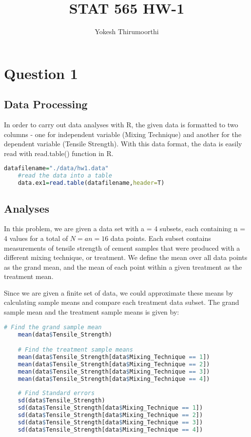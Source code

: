 \documentclass[11pt]{article}
\begin{document}
\title{STAT 565 HW-1}
\author{Yokesh Thirumoorthi}

\maketitle
\pagestyle{fancy}
\fancyhf{}

\section{Question 1}

\subsection{Data Processing}
In order to carry out data analyses with R, the given data is formatted to two columns - one for independent variable (Mixing Technique) and another for the dependent variable (Tensile Strength). With this data format, the data is easily read with read.table() function in R.

\begin{lstlisting}[language=R]
    datafilename="./data/hw1.data"
    #read the data into a table
    data.ex1=read.table(datafilename,header=T)
\end{lstlisting}

\subsection{Analyses}
In this problem, we are given a data set with a = 4 subsets, each containing n = 4 values for a total of $\displaystyle N=an=16$ data points. 
Each subset contains measurements of tensile strength of cement samples that were produced with a different mixing technique, or treatment. We define the mean over all data points as the grand mean, and the mean of each point within a given treatment as the treatment mean.

Since we are given a finite set of data, we could approximate these means by calculating sample means and compare each treatment data subset. The grand sample mean and the treatment sample means is given by: 

\begin{lstlisting}[language=R]
    # Find the grand sample mean
    mean(data$Tensile_Strength) 

    # Find the treatment sample means
    mean(data$Tensile_Strength[data$Mixing_Technique == 1])
    mean(data$Tensile_Strength[data$Mixing_Technique == 2])
    mean(data$Tensile_Strength[data$Mixing_Technique == 3])
    mean(data$Tensile_Strength[data$Mixing_Technique == 4])
    
    # Find Standard errors
    sd(data$Tensile_Strength)
    sd(data$Tensile_Strength[data$Mixing_Technique == 1])
    sd(data$Tensile_Strength[data$Mixing_Technique == 2])
    sd(data$Tensile_Strength[data$Mixing_Technique == 3])
    sd(data$Tensile_Strength[data$Mixing_Technique == 4])

\end{lstlisting}
\end{document}
